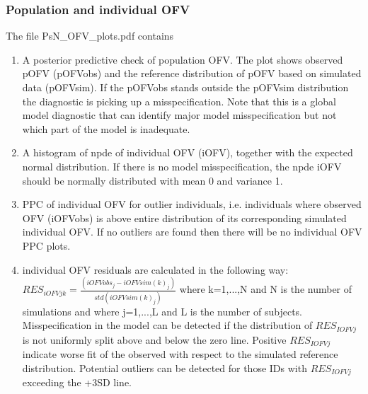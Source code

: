 \subsubsection{Population and individual OFV}
\noindent The file PsN\_OFV\_plots.pdf contains
\begin{enumerate}
\item A posterior predictive check of population OFV. The plot shows observed pOFV (pOFVobs) and the reference distribution of pOFV based on simulated data (pOFVsim). If the pOFVobs stands outside the pOFVsim distribution the diagnostic is picking up a misspecification. Note that this is a global model diagnostic that can identify major model misspecification but not which part of the model is inadequate.
\item A histogram of npde of individual OFV (iOFV), together with the expected normal distribution. If there is no model misspecification, the npde iOFV should be normally distributed with mean 0 and variance 1.
\item PPC of individual OFV for outlier individuals, i.e. individuals where observed OFV (iOFVobs) is above entire
distribution of its corresponding simulated individual OFV. If no outliers are found then there will be no individual OFV PPC plots.
\item individual OFV residuals are calculated in the following way:
$RES_{iOFVjk}=\frac{(iOFVobs_{j} - iOFVsim(k)_{j})}{std(iOFVsim(k)_{j})}$
where k=1,...,N and N is the number of simulations and where j=1,...,L and L is the number of subjects. Misspecification in the model can be detected if the distribution of $RES_{IOFVj}$ is not uniformly split above and below the zero line. Positive $RES_{IOFVj}$ indicate worse fit of the observed with respect to the simulated reference distribution. Potential outliers can be detected for those IDs with $RES_{IOFVj}$ exceeding the +3SD line. 
\end{enumerate}


